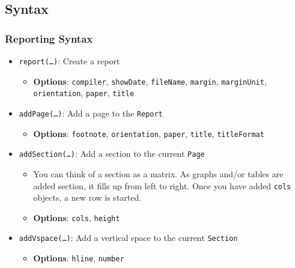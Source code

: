 \documentclass[10pt]{beamer}
\begin{document}
\subsection{Syntax}
\begin{frame}
  \frametitle{Reporting Syntax}
  \begin{itemize}
  \item \texttt{report(\ldots)}: Create a report
    \begin{itemize}
    \item \textbf{Options}: \texttt{compiler}, \texttt{showDate}, \texttt{fileName}, \texttt{margin}, \texttt{marginUnit}, \texttt{orientation}, \texttt{paper}, \texttt{title}
    \end{itemize}
  \item \texttt{addPage(\ldots)}: Add a page to the \texttt{Report}
    \begin{itemize}
    \item \textbf{Options}: \texttt{footnote}, \texttt{orientation}, \texttt{paper}, \texttt{title}, \texttt{titleFormat}
    \end{itemize}
  \item \texttt{addSection(\ldots)}: Add a section to the current \texttt{Page}
    \begin{itemize}
    \item You can think of a section as a matrix. As graphs and/or tables are added section, it fills up from left to right. Once you have added \texttt{cols} objects, a new row is started.
    \item \textbf{Options}: \texttt{cols}, \texttt{height}
    \end{itemize}
  \item \texttt{addVspace(\ldots)}: Add a vertical space to the current \texttt{Section}
    \begin{itemize}
    \item \textbf{Options}: \texttt{hline}, \texttt{number}
    \end{itemize}
  \end{itemize}
\end{frame}
\end{document}
